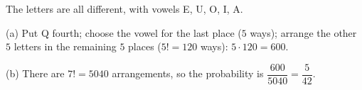 The letters are all different, with vowels E, U, O, I, A.

(a) Put Q fourth; choose the vowel for the last place ($5$ ways); arrange the other $5$ letters in the remaining $5$ places ($5!=120$ ways): $5\cdot120=\boxed{600}$.

(b) There are $7!=5040$ arrangements, so the probability is $\dfrac{600}{5040}=\boxed{\dfrac{5}{42}}$.
